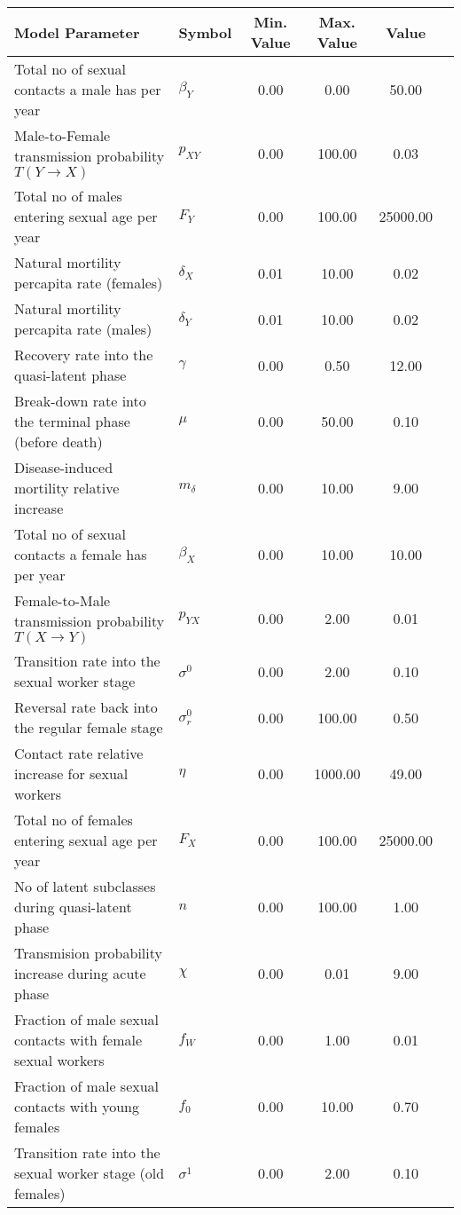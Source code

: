\begin{table}
\centering
\begin{tabular}{p{5cm}lcccc}
{\bf Model Parameter} & {\bf Symbol} & {\bf Min. Value} & {\bf Max. Value} & {\bf Value}\\
\hline\hline
Total no of sexual contacts a male has per year & $\beta_Y$ & 0.00 & 0.00 & 50.00\\
Male-to-Female transmission probability $T(Y\rightarrow X)$ & $p_{XY}$ & 0.00 & 100.00 & 0.03\\
Total no of males entering sexual age per year & $F_Y$ & 0.00 & 100.00 & 25000.00\\
Natural mortility percapita rate (females) & $\delta_X$ & 0.01 & 10.00 & 0.02\\
Natural mortility percapita rate (males) & $\delta_Y$ & 0.01 & 10.00 & 0.02\\
Recovery rate into the quasi-latent phase & $\gamma$ & 0.00 & 0.50 & 12.00\\
Break-down rate into the terminal phase (before death) & $\mu$ & 0.00 & 50.00 & 0.10\\
Disease-induced mortility relative increase & $m_{\delta}$ & 0.00 & 10.00 & 9.00\\
Total no of sexual contacts a female has per year & $\beta_X$ & 0.00 & 10.00 & 10.00\\
Female-to-Male transmission probability $T(X\rightarrow Y)$ & $p_{YX}$ & 0.00 & 2.00 & 0.01\\
Transition rate into the sexual worker stage & $\sigma^0$ & 0.00 & 2.00 & 0.10\\
Reversal rate back into the regular female stage & $\sigma^0_r$ & 0.00 & 100.00 & 0.50\\
Contact rate relative increase for sexual workers & $\eta$ & 0.00 & 1000.00 & 49.00\\
Total no of females entering sexual age per year & $F_X$ & 0.00 & 100.00 & 25000.00\\
No of latent subclasses during quasi-latent phase & $n$ & 0.00 & 100.00 & 1.00\\
Transmision probability increase during acute phase & $\chi$ & 0.00 & 0.01 & 9.00\\
Fraction of male sexual contacts with female sexual workers & $f_W$ & 0.00 & 1.00 & 0.01\\
Fraction of male sexual contacts with young females & $f_0$ & 0.00 & 10.00 & 0.70\\
Transition rate into the sexual worker stage (old females) & $\sigma^1$ & 0.00 & 2.00 & 0.10\\

\end{tabular}
\end{table}
